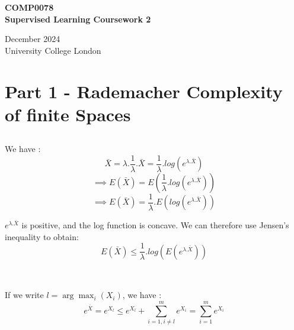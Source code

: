 \documentclass[final,3p,times,12pt]{article}
\begin{document}
\begin{titlepage}
    \centering
    \vspace*{2cm}
    
    {\Large \textbf{COMP0078}}\\[1cm] %
    {\Huge \textbf{Supervised Learning Coursework 2}}\\[1cm] %
    
    \vspace{1cm}
    
    {\Large December 2024}\\[1.5cm] %
    
    {\Large University College London} %
    
    \vfill
    
    
    \vspace{2cm}
    
\end{titlepage}
\newpage

\tableofcontents
\newpage


\section{Part 1 - Rademacher Complexity of finite Spaces}

\subsection{} We have : \[
\bar{X} = \lambda .\frac{1}{\lambda}.\bar{X} = \frac{1}{\lambda}.log(e^{\lambda.\bar{X}})
\]
\[
\implies E(\bar{X}) = E(\frac{1}{\lambda}.log(e^{\lambda.\bar{X}}))\]
\[
\implies E(\bar{X}) = \frac{1}{\lambda}.E(log(e^{\lambda.\bar{X}}))\]

$e^{\lambda.\bar{X}}$ is positive, and the log function is concave. We can therefore use Jensen's inequality to obtain:  
\[
E(\bar{X}) \leq \frac{1}{\lambda}.log(E(e^{\lambda.\bar{X}}))
\]\\

\subsection{} If we write $l=\arg\max_i (X_i)$, we have : 
\[
e^{\bar{X}} = e^{X_l} \leq  e^{X_l} + \sum_{i=1, i\neq l}^m e^{X_i} = \sum_{i=1}^m e^{X_i} \]
\end{document}
